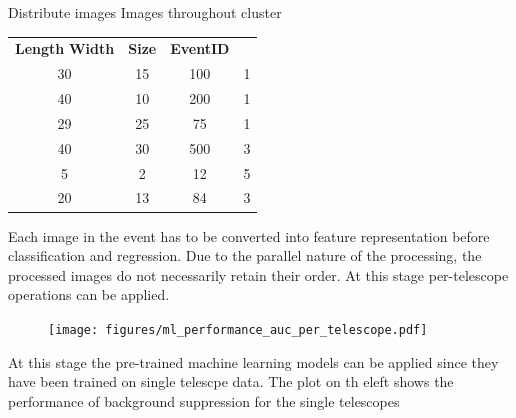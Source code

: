 \begin{multicols}{2}
\begin{center}
        \begin{streamblock}[height=2cm, width=0.8\linewidth]{-5mm}{-5mm}{}%
          \begin{center}
            Distribute images Images throughout cluster
          \end{center}
        \end{streamblock}%

        \begin{streamblock}[equal height group=C, width=0.8\linewidth]{-5mm}{-5mm}{}%
          \begin{multicols}{2}
            {\color{maincolor}
            \begin{tabularx}{\linewidth}{cccc}
              \rowcolor{gray!50}
                \textbf{Length} \textbf{Width} & \textbf{Size} & \textbf{EventID} \\
                30 & 15   & 100   & 1\\
                40 & 10  & 200  & 1\\
                29 & 25  & 75  & 1\\
                40 & 30  & 500 & 3\\
                5 & 2  & 12 & 5\\
                20 & 13  & 84 & 3
            \end{tabularx}
            }

            \columnbreak
            Each image in the event has to be converted into feature representation before classification and regression.
            Due to the parallel nature of the processing, the processed images do not necessarily retain their order.
            At this stage per-telescope operations can be applied.

          \end{multicols}
        \end{streamblock}%

        \begin{streamblock}[equal height group=C, width=0.8\linewidth]{-5mm}{-5mm}{}%
          \begin{multicols}{2}
            \begin{figure}
              \texttt{[image: figures/ml\_performance\_auc\_per\_telescope.pdf]}
            \end{figure}
            \columnbreak

            At this stage the pre-trained machine learning models can be applied since they
            have been trained on single telescpe data. The plot on th eleft shows the performance
            of background suppression for the single telescopes


\end{multicols}
\end{streamblock}
\end{center}
\end{multicols}
